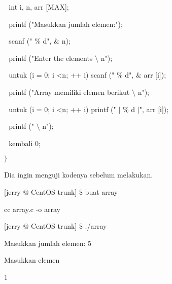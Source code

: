 \noindent 
 \hspace*{0.5in}  $  $ $  $ $  $int i, n, arr [MAX]; \par
\noindent 
 \hspace*{0.5in}  $  $ $  $ $  $printf ("Masukkan jumlah elemen:"); \par
\noindent 
 \hspace*{0.5in}  $  $ $  $ $  $scanf (" $  \%  $ d",  $  \&  $ n); \par
\noindent 
 \hspace*{0.5in}  $  $ $  $ $  $printf ("Enter the elements  $  \setminus  $ n"); \par
\noindent 
 \hspace*{0.5in}  $  $ $  $ $  $untuk (i = 0; i <n; ++ i) scanf (" $  \%  $ d",  $  \&  $ arr [i]); \par
\noindent 
 \hspace*{0.5in}  $  $ $  $ $  $printf ("Array memiliki elemen berikut  $  \setminus  $ n"); \par
\noindent 
 \hspace*{0.5in}  $  $ $  $ $  $untuk (i = 0; i <n; ++ i) printf (" $  \vert  $ $  \%  $ d  $  \vert  $", arr [i]); \par
\noindent 
 \hspace*{0.5in}  $  $ $  $ $  $printf (" $  \setminus  $ n"); \par
\noindent 
 \hspace*{0.5in}  $  $ $  $ $  $kembali 0; \par
\noindent 
 \hspace*{0.5in}  $  \}  $ \par
\noindent 
Dia ingin menguji kodenya sebelum melakukan. \par
\noindent 
 \hspace*{0.5in} [jerry @ CentOS trunk]  $  \$  $ buat array \par
\noindent 
 \hspace*{0.5in} cc array.c -o array \par
\noindent 
 \hspace*{0.5in} [jerry @ CentOS trunk]  $  \$  $ ./array \par
\noindent 
 \hspace*{0.5in} Masukkan jumlah elemen: 5 \par
\noindent 
 \hspace*{0.5in} Masukkan elemen \par
\noindent 
 \hspace*{0.5in}  \hspace*{0.5in} 1 \par
